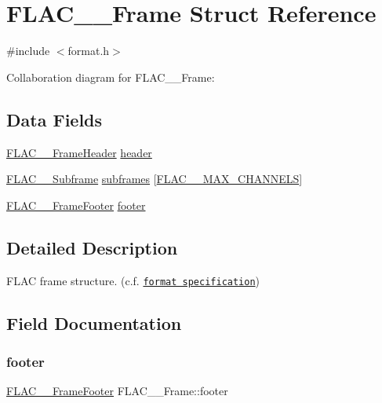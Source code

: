 \hypertarget{struct_f_l_a_c_____frame}{}\section{F\+L\+A\+C\+\_\+\+\_\+\+Frame Struct Reference}
\label{struct_f_l_a_c_____frame}


{\ttfamily \#include $<$format.\+h$>$}



Collaboration diagram for F\+L\+A\+C\+\_\+\+\_\+\+Frame\+:
\subsection*{Data Fields}
\begin{DoxyCompactItemize}
\item 
\hyperlink{struct_f_l_a_c_____frame_header}{F\+L\+A\+C\+\_\+\+\_\+\+Frame\+Header} \hyperlink{struct_f_l_a_c_____frame_ae39796592bb27512110976fe7b80ce06}{header}
\item 
\hyperlink{struct_f_l_a_c_____subframe}{F\+L\+A\+C\+\_\+\+\_\+\+Subframe} \hyperlink{struct_f_l_a_c_____frame_a526e3e6173e7a6db752e7a44bff3e91d}{subframes} \mbox{[}\hyperlink{group__flac__format_ga488aa5678a58d08f984f5d39185b763d}{F\+L\+A\+C\+\_\+\+\_\+\+M\+A\+X\+\_\+\+C\+H\+A\+N\+N\+E\+LS}\mbox{]}
\item 
\hyperlink{struct_f_l_a_c_____frame_footer}{F\+L\+A\+C\+\_\+\+\_\+\+Frame\+Footer} \hyperlink{struct_f_l_a_c_____frame_ae8862dd8210e49bda8179559891d2d4e}{footer}
\end{DoxyCompactItemize}


\subsection{Detailed Description}
F\+L\+AC frame structure. (c.\+f. \href{../format.html#frame}{\tt format specification}) 

\subsection{Field Documentation}
\mbox{\label{struct_f_l_a_c_____frame_ae8862dd8210e49bda8179559891d2d4e}} 
\subsubsection{\texorpdfstring{footer}{footer}}
{\footnotesize\ttfamily \hyperlink{struct_f_l_a_c_____frame_footer}{F\+L\+A\+C\+\_\+\+\_\+\+Frame\+Footer} F\+L\+A\+C\+\_\+\+\_\+\+Frame\+::footer}

